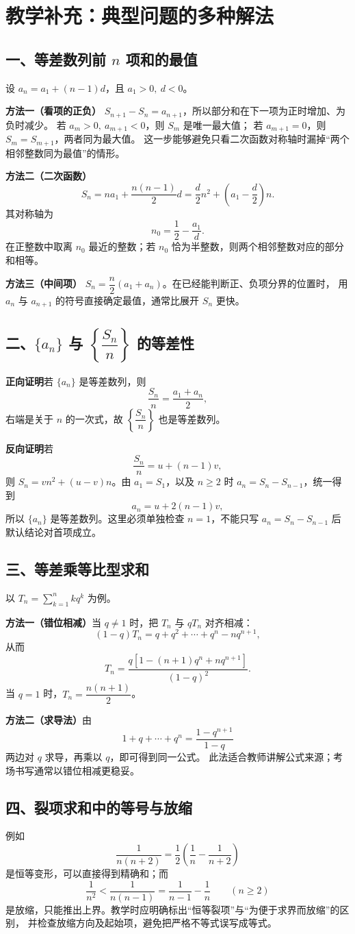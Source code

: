 \ifshowanswers
\section*{教学补充：典型问题的多种解法}

\subsection*{一、等差数列前 $n$ 项和的最值}
设 $a_n=a_1+(n-1)d$，且 $a_1>0,\ d<0$。

\textbf{方法一（看项的正负）}\quad
$S_{n+1}-S_n=a_{n+1}$，所以部分和在下一项为正时增加、为负时减少。
若 $a_m>0,\ a_{m+1}<0$，则 $S_m$ 是唯一最大值；
若 $a_{m+1}=0$，则 $S_m=S_{m+1}$，两者同为最大值。
这一步能够避免只看二次函数对称轴时漏掉“两个相邻整数同为最值”的情形。

\textbf{方法二（二次函数）}\quad
\[
S_n=na_1+\frac{n(n-1)}2d
=\frac d2n^2+\left(a_1-\frac d2\right)n .
\]
其对称轴为
\[
n_0=\frac12-\frac{a_1}{d}.
\]
在正整数中取离 $n_0$ 最近的整数；若 $n_0$ 恰为半整数，则两个相邻整数对应的部分和相等。

\textbf{方法三（中间项）}\quad
$S_n=\dfrac n2(a_1+a_n)$。在已经能判断正、负项分界的位置时，
用 $a_n$ 与 $a_{n+1}$ 的符号直接确定最值，通常比展开 $S_n$ 更快。

\subsection*{二、$\{a_n\}$ 与 $\left\{\dfrac{S_n}{n}\right\}$ 的等差性}
\textbf{正向证明}\quad 若 $\{a_n\}$ 是等差数列，则
\[
\frac{S_n}{n}=\frac{a_1+a_n}{2},
\]
右端是关于 $n$ 的一次式，故 $\left\{\dfrac{S_n}{n}\right\}$ 也是等差数列。

\textbf{反向证明}\quad 若
\[
\frac{S_n}{n}=u+(n-1)v,
\]
则 $S_n=vn^2+(u-v)n$。由 $a_1=S_1$，以及 $n\ge2$ 时
$a_n=S_n-S_{n-1}$，统一得到
\[
a_n=u+2(n-1)v,
\]
所以 $\{a_n\}$ 是等差数列。这里必须单独检查 $n=1$，不能只写
$a_n=S_n-S_{n-1}$ 后默认结论对首项成立。

\subsection*{三、等差乘等比型求和}
以 $T_n=\sum_{k=1}^n kq^k$ 为例。

\textbf{方法一（错位相减）}\quad 当 $q\ne1$ 时，把 $T_n$ 与 $qT_n$ 对齐相减：
\[
(1-q)T_n=q+q^2+\cdots+q^n-nq^{n+1},
\]
从而
\[
T_n=\frac{q\left[1-(n+1)q^n+nq^{n+1}\right]}{(1-q)^2}.
\]
当 $q=1$ 时，$T_n=\dfrac{n(n+1)}2$。

\textbf{方法二（求导法）}\quad 由
\[
1+q+\cdots+q^n=\frac{1-q^{n+1}}{1-q}
\]
两边对 $q$ 求导，再乘以 $q$，即可得到同一公式。
此法适合教师讲解公式来源；考场书写通常以错位相减更稳妥。

\subsection*{四、裂项求和中的等号与放缩}
例如
\[
\frac{1}{n(n+2)}
=\frac12\left(\frac1n-\frac1{n+2}\right)
\]
是恒等变形，可以直接得到精确和；而
\[
\frac1{n^2}<\frac1{n(n-1)}
=\frac1{n-1}-\frac1n\qquad(n\ge2)
\]
是放缩，只能推出上界。教学时应明确标出“恒等裂项”与“为便于求界而放缩”的区别，
并检查放缩方向及起始项，避免把严格不等式误写成等式。
\fi
